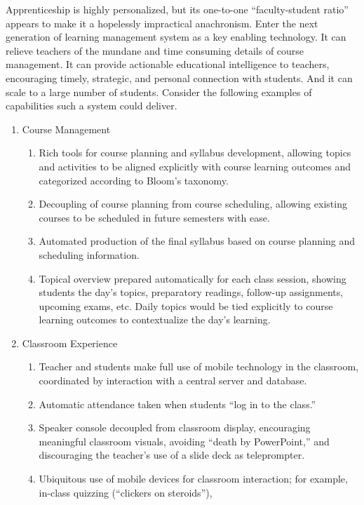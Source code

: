 \documentclass{article}
\begin{document}
Apprenticeship is highly personalized,
but its one-to-one ``faculty-student ratio''
appears to make it a hopelessly impractical anachronism.
Enter the next generation of learning management system
as a key enabling technology.
It can relieve teachers
of the mundane and time consuming details
of course management.
It can provide actionable educational intelligence to teachers,
encouraging timely, strategic, and personal connection with students.
And it can scale to a large number of students.
Consider the following examples of capabilities such a system could deliver.

\begin{enumerate}
\item{Course Management}
  \begin{enumerate}
  \item Rich tools for course planning and syllabus development, allowing topics and
    activities to be aligned explicitly with course learning outcomes and categorized
    according to Bloom's taxonomy.
  \item Decoupling of course planning from course scheduling, allowing existing courses to
    be scheduled in future semesters with ease.
  \item Automated production of the final syllabus based on course planning and scheduling
    information.
  \item Topical overview prepared automatically for each class session, showing students the
    day's topics, preparatory readings, follow-up assignments, upcoming exams, etc.
    Daily topics would be tied explicitly to course learning outcomes
    to contextualize the day's learning.
  \end{enumerate}
\item{Classroom Experience}
  \begin{enumerate}
  \item Teacher and students make full use of mobile technology in the classroom,
    coordinated by interaction with a central server and database.
  \item Automatic attendance taken when students ``log in to the class.''
  \item Speaker console decoupled from classroom display,
    encouraging meaningful classroom visuals,
    avoiding ``death by PowerPoint,'' and
    discouraging the teacher's use of a slide deck as teleprompter.
  \item Ubiquitous use of mobile devices for classroom interaction; for example,
    in-class quizzing (``clickers on steroids''),

\end{enumerate}
\end{enumerate}
\end{document}

